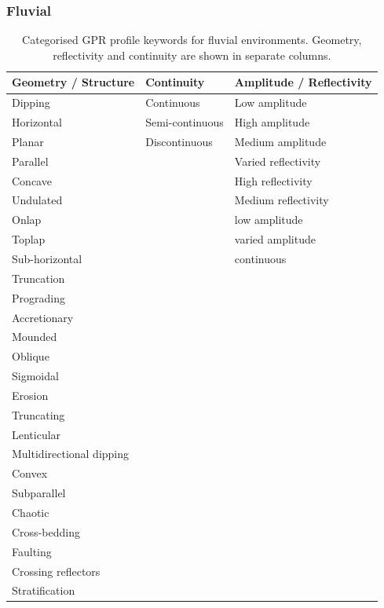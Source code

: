 \clearpage
\subsubsection{Fluvial}
\begin{table}[h!]
\centering
\caption{Categorised GPR profile keywords for fluvial environments. Geometry, reflectivity and continuity are shown in separate columns.}
\begin{tabular}{|p{5cm}|p{5cm}|p{5cm}|}
\hline
\textbf{Geometry / Structure} & \textbf{Continuity} & \textbf{Amplitude / Reflectivity} \\
\hline
Dipping & Continuous & Low amplitude \\
Horizontal & Semi-continuous & High amplitude \\
Planar & Discontinuous & Medium amplitude \\
Parallel & & Varied reflectivity \\
Concave & & High reflectivity \\
Undulated & & Medium reflectivity \\
Onlap & & low amplitude \\
Toplap & & varied amplitude \\
Sub-horizontal & & continuous \\
Truncation & & \\
Prograding & & \\
Accretionary & & \\
Mounded & & \\
Oblique & & \\
Sigmoidal & & \\
Erosion & & \\
Truncating & & \\
Lenticular & & \\
Multidirectional dipping & & \\
Convex & & \\
Subparallel & & \\
Chaotic & & \\
Cross-bedding & & \\
Faulting & & \\
Crossing reflectors & & \\
Stratification & & \\
\hline
\end{tabular}
\label{tab:fluvial-keywords}
\end{table}


